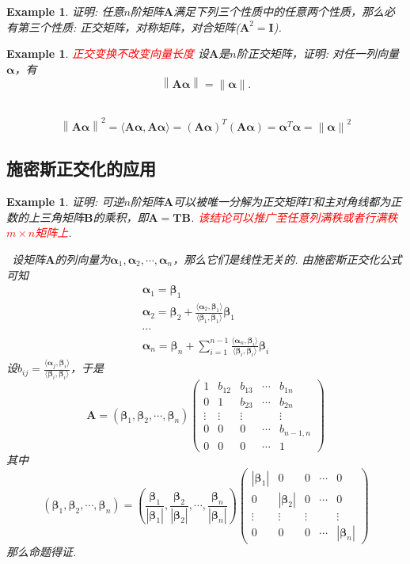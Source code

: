 \documentclass{article}
\newtheorem{example}[theorem]{Example}
\newcommand{\norm}[1]{\left\lVert#1\right\rVert} %
\newcommand{\hints}{{\color{blue} \text{hints}}}
\newcommand{\mbf}[1]{\bm{#1}}
\newcommand\inp[2]{\langle #1, #2 \rangle} %
\newcommand{\redt}[1]{\textcolor{red}{#1}}
\begin{document}
\begin{example}
\rm 证明: 任意$n$阶矩阵$\mbf{A}$满足下列三个性质中的任意两个性质，那么必有第三个性质: 正交矩阵，对称矩阵，对合矩阵($\mbf{A}^2 = \mbf{I}$). 
\end{example}

\begin{example}
\rm \redt{正交变换不改变向量长度} 设$\mbf{A}$是$n$阶正交矩阵，证明: 对任一列向量$\mbf{\alpha}$，有
$$
\norm{\mbf{A}\mbf{\alpha}} = \norm{\mbf{\alpha}}.
$$

\hints\ 
$$
\norm{\mbf{A}\mbf{\alpha}}^2 = \inp{\mbf{A}\mbf{\alpha}}{\mbf{A}\mbf{\alpha}} = (\mbf{A}\mbf{\alpha})^T(\mbf{A}\mbf{\alpha}) = \mbf{\alpha}^T\mbf{\alpha} = \norm{\mbf{\alpha}}^2
$$
\end{example}

\subsection{施密斯正交化的应用}
\begin{example}
\rm 证明: 可逆$n$阶矩阵$\mbf{A}$可以被唯一分解为正交矩阵$T$和主对角线都为正数的上三角矩阵$\mbf{B}$的乘积，即$\mbf{A} = \mbf{T}\mbf{B}$. \redt{该结论可以推广至任意列满秩或者行满秩$m \times n$矩阵上}. 

\hints\ 设矩阵$\mbf{A}$的列向量为$\mbf{\alpha}_1,\mbf{\alpha}_2,\cdots,\mbf{\alpha}_n$，那么它们是线性无关的. 由施密斯正交化公式可知
$$
\begin{array}{ll}
\mbf{\alpha}_1 = \mbf{\beta}_1 \\
\mbf{\alpha}_2 = \mbf{\beta}_2 + \frac{\inp{\mbf{\alpha}_2}{\mbf{\beta}_1}}{\inp{\mbf{\beta}_1}{\mbf{\beta}_1}}\mbf{\beta}_1\\
\cdots \\
\mbf{\alpha}_n = \mbf{\beta}_n + \sum\limits_{i=1}^{n-1}\frac{\inp{\mbf{\alpha}_n}{\mbf{\beta}_i}}{\inp{\mbf{\beta}_i}{\mbf{\beta}_i}}\mbf{\beta}_i
\end{array}
$$
设$b_{ij} = \frac{\inp{\mbf{\alpha}_j}{\mbf{\beta}_i}}{\inp{\mbf{\beta}_i}{\mbf{\beta}_i}}$，于是
$$
\mbf{A} = (\mbf{\beta}_1,\mbf{\beta}_2,\cdots,\mbf{\beta}_n)
\begin{pmatrix}
1 & b_{12} & b_{13} & \cdots & b_{1n} \\
0 & 1 & b_{23} & \cdots & b_{2n} \\
\vdots & \vdots & \vdots &  & \vdots\\
0 & 0 & 0 & \cdots & b_{n-1,n} \\
0 & 0 & 0 & \cdots & 1 
\end{pmatrix}
$$
其中
$$
\left(\mbf{\beta}_1,\mbf{\beta}_2,\cdots,\mbf{\beta}_n \right) = \left(\frac{\mbf{\beta}_1}{|\mbf{\beta}_1|},\frac{\mbf{\beta}_2}{|\mbf{\beta}_2|},\cdots,\frac{\mbf{\beta}_n}{|\mbf{\beta}_n|}\right)\begin{pmatrix}
|\mbf{\beta}_1| & 0 & 0 & \cdots & 0 \\
0 & |\mbf{\beta}_2| & 0 & \cdots & 0 \\
\vdots & \vdots & \vdots &  & \vdots \\ 
0 & 0 & 0 & \cdots & |\mbf{\beta}_n|
\end{pmatrix}
$$
那么命题得证. 
\end{example}
\end{document}

